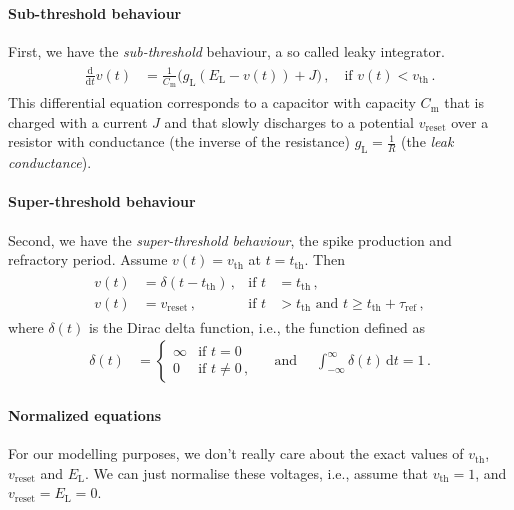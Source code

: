 \documentclass[10pt,letterpaper,oneside]{article}
\begin{document}
\paragraph{Sub-threshold behaviour}
First, we have the \emph{sub-threshold} behaviour, a so called leaky integrator.
\begin{align}
	\begin{aligned}
		\frac{\mathrm{d}}{\mathrm{d}t} v(t) &= \frac{1}{C_\mathrm{m}} \big(g_\mathrm{L} (E_\mathrm{L} - v(t))
			+ J
		\big) \,, \quad \text{if } v(t) < v_\mathrm{th}\,.
	\end{aligned}
	\label{eqn:sub-threshold}
\end{align}
This differential equation corresponds to a capacitor with capacity $C_\mathrm{m}$ that is charged with a current $J$ and that slowly discharges to a potential $v_\mathrm{reset}$ over a resistor with conductance (the inverse of the resistance) $g_\mathrm{L} = \frac{1}{R}$ (the \emph{leak conductance}).

\paragraph{Super-threshold behaviour}
Second, we have the \emph{super-threshold behaviour}, the spike production and refractory period. Assume $v(t) = v_\mathrm{th}$ at $t = t_\mathrm{th}$. Then
\begin{align}
	\begin{aligned}
		v(t) &= \delta(t - t_\mathrm{th}) \,, &\text{if } t &= t_\mathrm{th} \,,\\
		v(t) &= v_\mathrm{reset} \,, &\text{if } t &> t_\mathrm{th} \text{ and } t \geq t_\mathrm{th} + \tau_\mathrm{ref} \,,
	\end{aligned}
	\label{eqn:super-threshold}
\end{align}
where $\delta(t)$ is the Dirac delta function, i.e., the function defined as
\begin{align*}
	\delta(t) &= \begin{cases} \infty & \text{if } t = 0 \, \\ 0 & \text{if } t \neq 0 \,, \end{cases}  \quad \text{ and } \quad \int_{-\infty}^\infty \delta(t)\,\mathrm{d}t = 1 \,.
\end{align*}

\paragraph{Normalized equations}
For our modelling purposes, we don't really care about the exact values of $v_\mathrm{th}$, $v_\mathrm{reset}$ and $E_\mathrm{L}$. We can just normalise these voltages, i.e., assume that $v_\mathrm{th} = 1$, and $v_\mathrm{reset} = E_\mathrm{L} = 0$.
\end{document}
